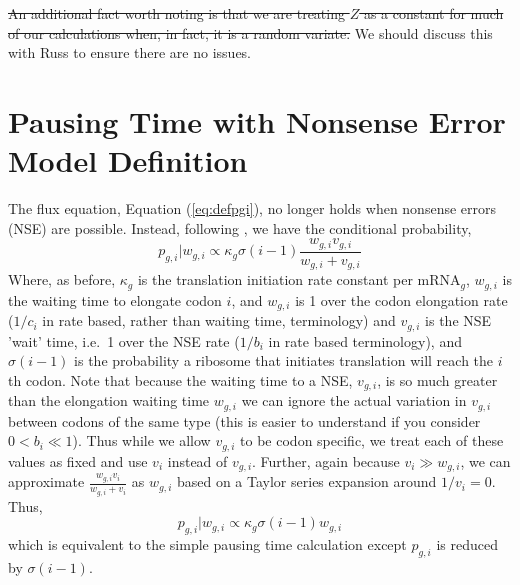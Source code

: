 \documentclass{article}
\newcommand{\elongWaitTime}{\ensuremath{w}\xspace}
\newcommand{\wgi}{\ensuremath{\elongWaitTime_{g,i}}\xspace}
\newcommand{\alphac}{\ensuremath{{\alpha_c}}\xspace}
\newcommand{\lambdacprime}{\ensuremath{{\lambda_c^\prime}}\xspace}
\newcommand{\nseWaitTime}{\ensuremath{v}\xspace}
\newcommand{\vgi}{\ensuremath{\nseWaitTime_{g,i}}\xspace}
\newcommand{\vi}{\ensuremath{\nseWaitTime_{i}}\xspace}
\newcommand{\pgi}{\ensuremath{{p_{g,i}}}\xspace}
\newcommand{\ngc}{\ensuremath{{n_{g}^c}}\xspace}
\newcommand{\kappag}{\ensuremath{{\kappa_{g}}}\xspace}
\newcommand{\mRNAg}{mRNA$_g$\xspace}
\newcommand{\Ygc}{\ensuremath{{Y_{g}^c}}\xspace}
\begin{document}
\sout{An additional fact worth noting is that we are treating $Z$ as a constant for much of our calculations when, in fact, it is a random variate.}
We should discuss this with Russ to ensure there are no issues.



\section*{Pausing Time with Nonsense Error Model Definition}
The flux equation, Equation (\ref{eq:defpgi}), no longer holds when nonsense errors (NSE) are possible.
Instead, following \citet{GilchristAndWagner2006}, we have the conditional probability,
\begin{equation}
\label{eq:defpgiNse}
\pgi|\wgi \propto \kappag \sigma(i-1) \frac{\wgi \vgi}{\wgi + \vgi}
\end{equation} 
Where, as before, \kappag is the translation initiation rate constant per \mRNAg, \wgi is the waiting time to elongate codon $i$, and  \wgi is 1 over the codon elongation rate ($1/c_i$ in rate based, rather than waiting time, terminology) and \vgi is the NSE 'wait' time, i.e.~1 over the NSE rate ($1/b_i$ in rate based terminology), and $\sigma(i-1)$ is the probability a ribosome that initiates translation will reach the $i$th codon.
Note that because the waiting time to a NSE, \vgi, is so much greater than the elongation waiting time \wgi we can ignore the actual variation in \vgi between codons of the same type (this is easier to understand if you consider $0 < b_i \ll 1$).
Thus while we allow \vgi to be codon specific, we treat each of these values as fixed and use \vi instead of \vgi.
Further, again because $\vi \gg \wgi$, we can approximate $\frac{\wgi \vi}{\wgi + \vi}$ as $\wgi$ based on a Taylor series expansion around $1/\vi = 0 $.
Thus,
\begin{equation}
\label{eq:defpgiNseApprox}
\pgi|\wgi \propto \kappag \sigma(i-1) \wgi
\end{equation} 
which is equivalent to the simple pausing time calculation except $\pgi$ is reduced by $\sigma(i-1)$.
\end{document}
